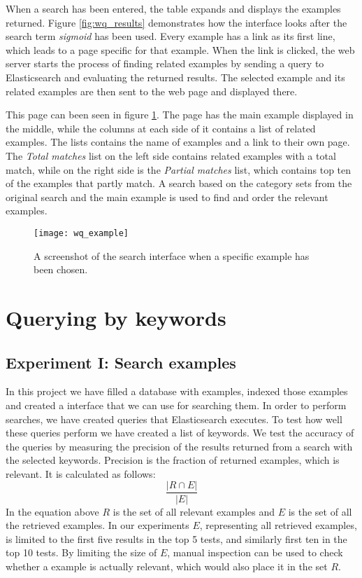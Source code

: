 When a search has been entered, the table expands and displays the examples returned. Figure \ref{fig:wq_results} demonstrates how the interface looks after the search term \textit{sigmoid} has been used. Every example has a link as its first line, which leads to a page specific for that example. When the link is clicked, the web server starts the process of finding related examples by sending a query to Elasticsearch and evaluating the returned results. The selected example and its related examples are then sent to the web page and displayed there.

This page can been seen in figure \ref{fig:wq_example}. The page has the main example displayed in the middle, while the columns at each side of it contains a list of related examples. The lists contains the name of examples and a link to their own page. The \textit{Total matches} list on the left side contains related examples with a total match, while on the right side is the \textit{Partial matches} list, which contains top ten of the examples that partly match. A search based on the category sets from the original search and the main example is used to find and order the relevant examples.

\begin{figure}[H] 
\caption{A screenshot of the search interface when a specific example has been chosen.}
\texttt{[image: wq\_example]}
\label{fig:wq_example}
\end{figure}

\section{Querying by keywords} \label{5:keywords}

\subsection{Experiment I: Search examples} \label{search_experiment}
In this project we have filled a database with examples, indexed those examples and created a interface that we can use for searching them. In order to perform searches, we have created queries that Elasticsearch executes. To test how well these queries perform we have created a list of keywords. We test the accuracy of the queries by measuring the precision of the results returned from a search with the selected  keywords. Precision is the fraction of returned examples, which is relevant. It is calculated as follows:
\[\frac{|R \cap E |}{|E|}\]
In the equation above \(R\) is the set of all relevant examples and \(E\) is the set of all the retrieved examples.
In our experiments \(E\), representing all retrieved examples, is limited to the first five results in the top 5 tests, and similarly first ten in the top 10 tests. By limiting the size of \(E\), manual inspection can be used to check whether a example is actually relevant, which would also place it in the set \(R\).

